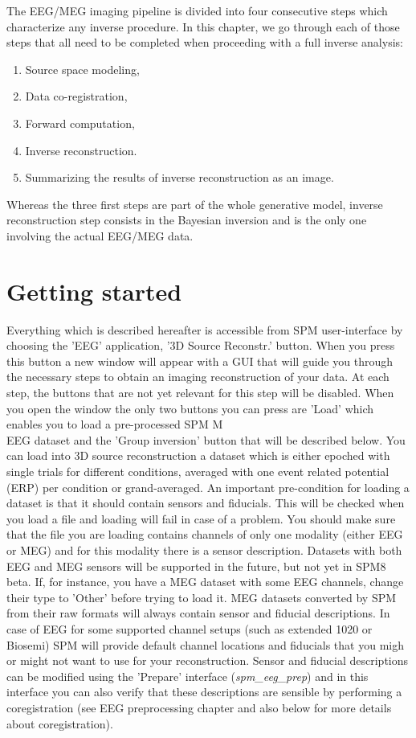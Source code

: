 The EEG/MEG imaging pipeline is divided into four consecutive steps which characterize
any inverse procedure. In this chapter, we go through each of those steps that all need 
to be completed when proceeding with a full inverse analysis:

\begin{enumerate}
    \item Source space modeling,
    \item Data co-registration,
    \item Forward computation,
    \item Inverse reconstruction.
    \item Summarizing the results of inverse reconstruction as an image.
\end{enumerate}

Whereas the three first steps are part of the whole generative model, inverse reconstruction
step consists in the Bayesian inversion and is the only one involving the actual EEG/MEG data.\\

\section{Getting started}

Everything which is described hereafter is accessible from SPM user-interface by choosing 
the 'EEG' application, '3D Source Reconstr.' button. When you press this button a new window
will appear with a GUI that will guide you through the necessary steps to obtain an imaging
reconstruction of your data. At each step, the buttons that are not yet relevant for this step
will be disabled. When you open the window the only two buttons you can press are 'Load' which enables you
to load a pre-processed SPM M\\EEG dataset and the 'Group inversion' button that will be described below. 
You can load into 3D source reconstruction a dataset which is either epoched with single trials for different
conditions, averaged with one event related potential (ERP) per condition or grand-averaged. An important pre-condition
for loading a dataset is that it should contain sensors and fiducials. This will be checked when you load a file
and loading will fail in case of a problem. You should make sure that the file you are loading
contains channels of only one modality (either EEG or MEG) and for this modality there is a sensor description. 
Datasets with both EEG and MEG sensors will be supported in the future, but not yet in SPM8 beta.
If, for instance, you have a MEG dataset with some EEG channels, change their type to 'Other' before trying to load it.
MEG datasets converted by SPM from their raw formats will always contain
sensor and fiducial descriptions. In case of EEG for some supported channel setups (such as extended 1020 or Biosemi)
SPM will provide default channel locations and fiducials that you migh or might not want to use for your reconstruction.
Sensor and fiducial descriptions can be modified using the 'Prepare' interface (\textit{spm\_eeg\_prep}) and in this
interface you can also verify that these descriptions are sensible by performing a coregistration (see EEG preprocessing
chapter and also below for more details about coregistration). 

